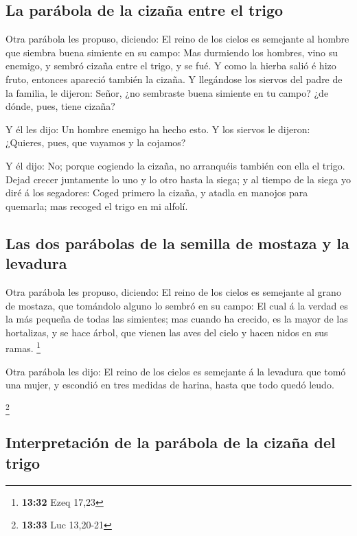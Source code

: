 \hypertarget{la-paruxe1bola-de-la-cizauxf1a-entre-el-trigo}{%
\subsection{La parábola de la cizaña entre el
trigo}\label{la-paruxe1bola-de-la-cizauxf1a-entre-el-trigo}}

 Otra parábola les propuso, diciendo: El reino de los
cielos es semejante al hombre que siembra buena simiente en su campo:
 Mas durmiendo los hombres, vino su enemigo, y sembró
cizaña entre el trigo, y se fué.  Y como la hierba salió
é hizo fruto, entonces apareció también la cizaña.  Y
llegándose los siervos del padre de la familia, le dijeron: Señor, ¿no
sembraste buena simiente en tu campo? ¿de dónde, pues, tiene cizaña?

 Y él les dijo: Un hombre enemigo ha hecho esto. Y los
siervos le dijeron: ¿Quieres, pues, que vayamos y la cojamos?

 Y él dijo: No; porque cogiendo la cizaña, no arranquéis
también con ella el trigo.  Dejad crecer juntamente lo
uno y lo otro hasta la siega; y al tiempo de la siega yo diré á los
segadores: Coged primero la cizaña, y atadla en manojos para quemarla;
mas recoged el trigo en mi alfolí.

\hypertarget{las-dos-paruxe1bolas-de-la-semilla-de-mostaza-y-la-levadura}{%
\subsection{Las dos parábolas de la semilla de mostaza y la
levadura}\label{las-dos-paruxe1bolas-de-la-semilla-de-mostaza-y-la-levadura}}

 Otra parábola les propuso, diciendo: El reino de los
cielos es semejante al grano de mostaza, que tomándolo alguno lo sembró
en su campo:  El cual á la verdad es la más pequeña de
todas las simientes; mas cuando ha crecido, es la mayor de las
hortalizas, y se hace árbol, que vienen las aves del cielo y hacen nidos
en sus ramas. \footnote{\textbf{13:32} Ezeq 17,23}

 Otra parábola les dijo: El reino de los cielos es
semejante á la levadura que tomó una mujer, y escondió en tres medidas
de harina, hasta que todo quedó leudo.

\footnote{\textbf{13:33} Luc 13,20-21}

\hypertarget{interpretaciuxf3n-de-la-paruxe1bola-de-la-cizauxf1a-del-trigo}{%
\subsection{Interpretación de la parábola de la cizaña del
trigo}\label{interpretaciuxf3n-de-la-paruxe1bola-de-la-cizauxf1a-del-trigo}}

